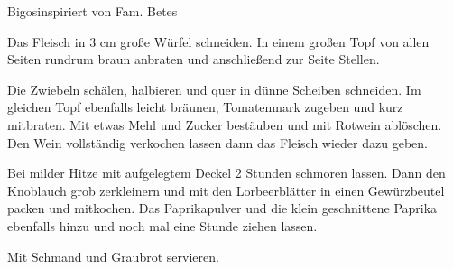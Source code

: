\begin{recipe}{Bigos}{inspiriert von Fam. Betes}
  \label{Bigos}
  \inglist

\steps

Das Fleisch in 3 cm große Würfel schneiden. In einem großen Topf von allen
Seiten rundrum braun anbraten und anschließend zur Seite Stellen.

Die Zwiebeln schälen, halbieren und quer in dünne Scheiben schneiden. Im
gleichen Topf ebenfalls leicht bräunen, Tomatenmark zugeben und kurz mitbraten.
Mit etwas Mehl und Zucker bestäuben und mit Rotwein ablöschen. Den Wein
vollständig verkochen lassen dann das Fleisch wieder dazu geben.

Bei milder Hitze mit aufgelegtem Deckel 2 Stunden schmoren lassen. Dann den
Knoblauch grob zerkleinern und mit den Lorbeerblätter in einen Gewürzbeutel
packen und mitkochen. Das Paprikapulver und die klein geschnittene Paprika
ebenfalls hinzu und noch mal eine Stunde ziehen lassen.

Mit Schmand und Graubrot servieren.

\end{recipe}

